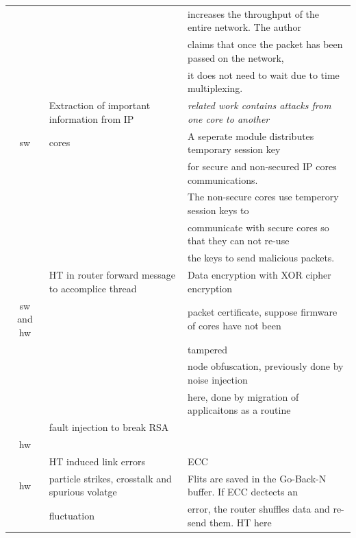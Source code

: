 \documentclass[]{article}
\begin{document}
\begin{table}[!t]
\begin{tabular}{c l l}
							& 													& increases the throughput of the entire network. The author\\
							& 													& claims that once the packet has been passed on the network,\\
							& 													& it does not need to wait due to time multiplexing.\\
	\hline
	\cite{kapoor2013security}& Extraction of important information from IP 		& \textit{related work contains attacks from one core to another}\\
	sw						& cores												& A seperate module distributes temporary session key  \\
							&      												& for secure and non-secured IP cores communications.  \\
							&      												& The non-secure cores use temperory session keys to  \\
							&      												& communicate with secure cores so that they can not re-use  \\
							&													& the keys to send malicious packets.\\
	\hline
	~\cite{ancajas2014fort} & HT in router forward message to accomplice thread & Data encryption with XOR cipher encryption \\
	sw and hw				&													& packet certificate, suppose firmware of cores have not been \\
							& 													& tampered\\
							&													& node obfuscation, previously done by noise injection\\
							& 													& here, done by migration of applicaitons as a routine\\
	\hline
	~\cite{pellegrini2010fault} & fault injection to break RSA					&\\
	hw						&													&\\
	\hline
	~\cite{yu2013exploiting}& HT induced link errors							& ECC\\
	hw						& particle strikes, crosstalk and spurious volatge  & Flits are saved in the Go-Back-N buffer. If ECC dectects an \\
							& fluctuation										& error, the router shuffles data and re-send them. HT here  \\

\end{tabular}
\end{table}
\end{document}
